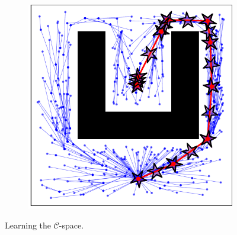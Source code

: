 \documentclass{beamer}
\begin{document}
\begin{frame}
\begin{figure}[!ht]
\begin{subfigure}[b]{0.45\textwidth}
		\end{subfigure}  
		\begin{subfigure}[b]{0.45\textwidth}
			\includegraphics[width=\textwidth]{figChap4/RRTstar2DML_maze237.2.pdf}
			 
		\end{subfigure}
		\caption{Learning the $\mathcal{C}$-space.}
		\label{fig:LearningConfigSpace2D}
	  \end{figure}
\end{frame}	
\end{document}
